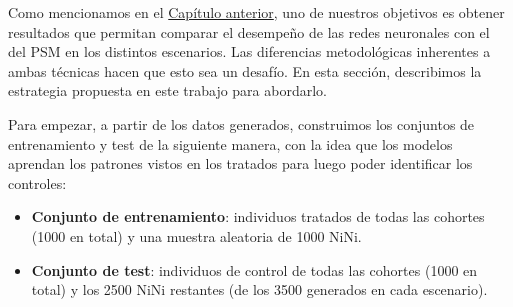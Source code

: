 \documentclass[../../main.tex]{subfiles}
\begin{document}
Como mencionamos en el \hyperref[chap:problema]{Capítulo anterior}, uno de nuestros
objetivos es obtener resultados que permitan comparar el desempeño de las redes neuronales
con el del PSM en los distintos escenarios. Las diferencias metodológicas inherentes a
ambas técnicas hacen que esto sea un desafío. En esta sección, describimos la estrategia
propuesta en este trabajo para abordarlo.

Para empezar, a partir de los datos generados, construimos los conjuntos de entrenamiento
y test de la siguiente manera, con la idea que los modelos aprendan los patrones vistos en
los tratados para luego poder identificar los controles:
\begin{itemize}
    \item \textbf{Conjunto de entrenamiento}: individuos tratados de todas las cohortes
    (1000 en total) y una muestra aleatoria de 1000 NiNi.
    \item \textbf{Conjunto de test}: individuos de control de todas las cohortes (1000 en
    total) y los 2500 NiNi restantes (de los 3500 generados en cada escenario).
\end{itemize}
\end{document}
